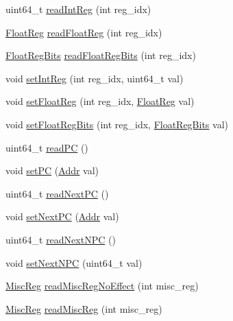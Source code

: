 \begin{DoxyCompactItemize}
\item 
uint64\_\-t \hyperlink{classOzoneCPU_1_1OzoneTC_a21c850cd41ab977a2cf3450fe66ec25a}{readIntReg} (int reg\_\-idx)
\item 
\hyperlink{classThreadContext_a75484259f1855aabc8d74c6eb1cfe186}{FloatReg} \hyperlink{classOzoneCPU_1_1OzoneTC_a34ccc34c22b261f80e9b0d0803aac24b}{readFloatReg} (int reg\_\-idx)
\item 
\hyperlink{classThreadContext_aab5eeae86499f9bfe15ef79360eccc64}{FloatRegBits} \hyperlink{classOzoneCPU_1_1OzoneTC_a0d251dc1da1814673c7548cf46caf6ca}{readFloatRegBits} (int reg\_\-idx)
\item 
void \hyperlink{classOzoneCPU_1_1OzoneTC_abc264e8ee37c6bd7d7b5759b97c34356}{setIntReg} (int reg\_\-idx, uint64\_\-t val)
\item 
void \hyperlink{classOzoneCPU_1_1OzoneTC_ab6fd8e55b81c173f448ec0c42bc28b99}{setFloatReg} (int reg\_\-idx, \hyperlink{classThreadContext_a75484259f1855aabc8d74c6eb1cfe186}{FloatReg} val)
\item 
void \hyperlink{classOzoneCPU_1_1OzoneTC_a618651078f08ecd328dfe3312f0f2ea7}{setFloatRegBits} (int reg\_\-idx, \hyperlink{classThreadContext_aab5eeae86499f9bfe15ef79360eccc64}{FloatRegBits} val)
\item 
uint64\_\-t \hyperlink{classOzoneCPU_1_1OzoneTC_a30cb2afdfdc1383b7804c167dcf5ee78}{readPC} ()
\item 
void \hyperlink{classOzoneCPU_1_1OzoneTC_a9bd96a8460a26f24f520db702f3f6eec}{setPC} (\hyperlink{base_2types_8hh_af1bb03d6a4ee096394a6749f0a169232}{Addr} val)
\item 
uint64\_\-t \hyperlink{classOzoneCPU_1_1OzoneTC_acac7689eb460c7ab0e23797c198b7028}{readNextPC} ()
\item 
void \hyperlink{classOzoneCPU_1_1OzoneTC_a81b908e5de6420bc0c5a0c5b9b1e38c2}{setNextPC} (\hyperlink{base_2types_8hh_af1bb03d6a4ee096394a6749f0a169232}{Addr} val)
\item 
uint64\_\-t \hyperlink{classOzoneCPU_1_1OzoneTC_a1c4619d610f95bf0728b5bfb0333507c}{readNextNPC} ()
\item 
void \hyperlink{classOzoneCPU_1_1OzoneTC_ad9318b66094af0afc4246ccce9fafe0b}{setNextNPC} (uint64\_\-t val)
\item 
\hyperlink{classThreadContext_aaf5f073a387db0556d1db4bcc45428bc}{MiscReg} \hyperlink{classOzoneCPU_1_1OzoneTC_a1a9e07a956ef5a2611fe7cd590872097}{readMiscRegNoEffect} (int misc\_\-reg)
\item 
\hyperlink{classThreadContext_aaf5f073a387db0556d1db4bcc45428bc}{MiscReg} \hyperlink{classOzoneCPU_1_1OzoneTC_a34ce48319c94bd2802d790e830357b9c}{readMiscReg} (int misc\_\-reg)

\end{DoxyCompactItemize}
